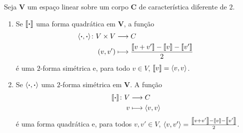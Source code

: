 \begin{proposition}
Seja $\bm V$ um espaço linear sobre um corpo $\bm C$ de característica diferente de $2$.
	\begin{enumerate}
	\item Se $\qua{\var}$ uma forma quadrática em $\bm V$, a função
		\begin{align*}
		\func{\inte{\var}{\var}}{V \times V}{C}{(v,v')}{\frac{\qua{v+v'} - \qua{v} - \qua{v'}}{2}}
		\end{align*}
	é uma $2$-forma simétrica e, para todo $v \in V$, $\qua{v} = \inte{v}{v}$.
	\item Se ${\inte{\var}{\var}}$ uma $2$-forma simétrica em $\bm V$. A função
		\begin{align*}
		\func{\qua{\var}}{V}{C}{v}{\inte{v}{v}}
		\end{align*}
	é uma forma quadrática e, para todos $v,v' \in V$, $\inte{v}{v'} = \frac{\qua{v+v'} - \qua{v} - \qua{v'}}{2}$.
	\end{enumerate}
\end{proposition}
